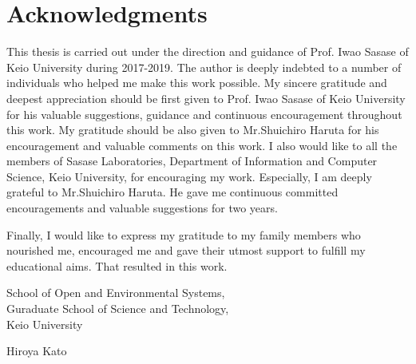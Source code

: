 \chapter*{Acknowledgments}

This thesis is carried out under the direction and guidance of Prof. Iwao Sasase of Keio University during 2017-2019.
The author is deeply indebted to a number of individuals who helped me make this work possible.  
My sincere gratitude and deepest appreciation should be first given to Prof. Iwao Sasase of Keio University for his valuable suggestions, guidance and continuous encouragement throughout this work.
My gratitude should be also given to Mr.Shuichiro Haruta for his encouragement and valuable comments on this work.
I also would like to all the members of Sasase Laboratories, Department of Information and Computer Science, Keio University, for encouraging my work.  
Especially, I am deeply grateful to Mr.Shuichiro Haruta.
He gave me continuous committed encouragements and valuable suggestions for two years.

Finally, I would like to express my gratitude to my family members who nourished me, encouraged me and gave their utmost support to fulfill my educational aims.
That resulted in this work.  
\sl
\vspace{1.5cm}
\begin{flushleft}\baselineskip=18pt
School of Open and Environmental Systems,\\ Guraduate School of Science and Technology,\\
Keio University
\end{flushleft}

\bf
\vspace{0.5cm}
\begin{flushright}
Hiroya Kato\\
\end{flushright}
